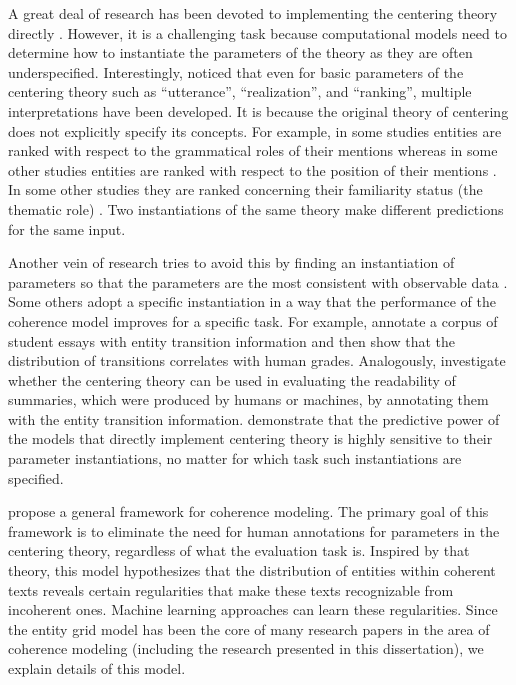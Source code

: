 A great deal of research has been devoted to implementing the centering theory directly \cite{miltsakaki00,karamanis04a}.  
However, it is a challenging task because computational models need to determine how to instantiate the parameters of the theory as they are often underspecified. 
Interestingly,  noticed that even for basic parameters of the centering theory such as ``utterance'', ``realization'', and ``ranking'', multiple interpretations have been developed.
It is because the original theory of centering does not explicitly specify its concepts. 
For example, in some studies entities are ranked with respect to the grammatical roles of their mentions \cite{brennan87,grosz95} whereas in some other studies entities are ranked with respect to the position of their mentions \cite{prince81a}. 
In some other studies they are ranked concerning their familiarity status (the thematic role) \cite{strube.cl99,moens08}.  
Two instantiations of the same theory make different predictions for the same input. 

Another vein of research tries to avoid this by finding an instantiation of parameters so that the parameters are the most consistent with observable data \cite{strube.cl99,karamanis04a,poesio04b}. 
Some others adopt a specific instantiation in a way that the performance of the coherence model improves for a specific task. 
For example,  annotate a corpus of student essays with entity transition information and then show that the distribution of transitions correlates with human grades. 
Analogously,  investigate whether the centering theory can be used in evaluating the readability of summaries, which were produced by humans or machines, by annotating them with the entity transition information. 
 demonstrate that the predictive power of the models that directly implement centering theory is highly sensitive to their parameter instantiations, no matter for which task such instantiations are specified. 

 propose a general framework for coherence modeling.  
The primary goal of this framework is to eliminate the need for human annotations for parameters in the centering theory, regardless of what the evaluation task is. 
Inspired by that theory, this model hypothesizes that the distribution of entities within coherent texts reveals certain regularities that make these texts recognizable from incoherent ones. 
Machine learning approaches can learn these regularities.  
Since the entity grid model has been the core of many research papers in the area of coherence modeling (including the research presented in this dissertation), we explain details of this model. 

